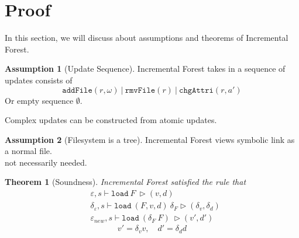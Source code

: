\documentclass[10pt,twoside,a4paper]{article}
\theoremstyle{theorem}
\newtheorem{theorem}{Theorem}[section]
\theoremstyle{lemma}
\theoremstyle{property}
\theoremstyle{definition}
\theoremstyle{assumption}
\newtheorem{assumption}{Assumption}[section]
\begin{document}
\newpage
\section{Proof}
In this section, we will discuss about assumptions and theorems of Incremental Forest.
\begin{assumption}[Update Sequence]
	Incremental Forest takes in a sequence of updates consists of 
	\begin{displaymath}
		\mathtt{addFile}(r,\omega) ~|~ \mathtt{rmvFile}(r) ~|~ \mathtt{chgAttri}(r,a')
	\end{displaymath}
	Or empty sequence $\emptyset$.
\end{assumption}

Complex updates can be constructed from atomic updates.

\begin{assumption}[Filesystem is a tree]
	Incremental Forest views symbolic link as a normal file. \\
	not necessarily needed.
\end{assumption}

\begin{theorem}[Soundness]
	Incremental Forest satisfied the rule that
	\begin{align*}
		& \varepsilon, s \vdash \mathtt{load}~ F~ \rhd (v,d)\\
		& \delta_\varepsilon, s \vdash \mathtt{load}~ (F,v,d)~ \delta_F \rhd (\delta_v,\delta_d)\\
		& \varepsilon_{new}, s \vdash \mathtt{load}~ (\delta_F~F)~ \rhd (v',d')
	\end{align*}
	\begin{displaymath}
		v' = \delta_v v, \quad d' = \delta_d d
	\end{displaymath}
\end{theorem}
\end{document}
